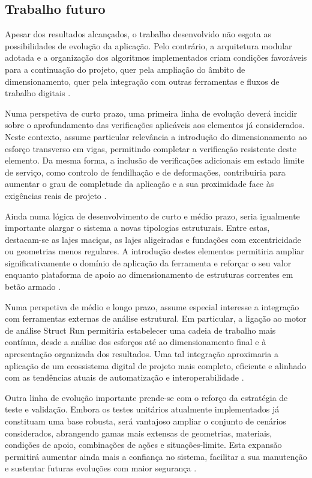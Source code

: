 \subsection{Trabalho futuro}

Apesar dos resultados alcançados, o trabalho desenvolvido não esgota as possibilidades de evolução da aplicação. Pelo contrário, a arquitetura modular adotada e a organização dos algoritmos implementados criam condições favoráveis para a continuação do projeto, quer pela ampliação do âmbito de dimensionamento, quer pela integração com outras ferramentas e fluxos de trabalho digitais \cite{DjangoDocs,PythonDocs,Structrun}.

Numa perspetiva de curto prazo, uma primeira linha de evolução deverá incidir sobre o aprofundamento das verificações aplicáveis aos elementos já considerados. Neste contexto, assume particular relevância a introdução do dimensionamento ao esforço transverso em vigas, permitindo completar a verificação resistente deste elemento. Da mesma forma, a inclusão de verificações adicionais em estado limite de serviço, como controlo de fendilhação e de deformações, contribuiria para aumentar o grau de completude da aplicação e a sua proximidade face às exigências reais de projeto \cite{EN1992,Appleton,AppletonGomes}.

Ainda numa lógica de desenvolvimento de curto e médio prazo, seria igualmente importante alargar o sistema a novas tipologias estruturais. Entre estas, destacam-se as lajes maciças, as lajes aligeiradas e fundações com excentricidade ou geometrias menos regulares. A introdução destes elementos permitiria ampliar significativamente o domínio de aplicação da ferramenta e reforçar o seu valor enquanto plataforma de apoio ao dimensionamento de estruturas correntes em betão armado \cite{EN1992,Mosley,LNECGuias}.

Numa perspetiva de médio e longo prazo, assume especial interesse a integração com ferramentas externas de análise estrutural. Em particular, a ligação ao motor de análise Struct Run permitiria estabelecer uma cadeia de trabalho mais contínua, desde a análise dos esforços até ao dimensionamento final e à apresentação organizada dos resultados. Uma tal integração aproximaria a aplicação de um ecossistema digital de projeto mais completo, eficiente e alinhado com as tendências atuais de automatização e interoperabilidade \cite{Structrun,DjangoDocs}.

Outra linha de evolução importante prende-se com o reforço da estratégia de teste e validação. Embora os testes unitários atualmente implementados já constituam uma base robusta, será vantajoso ampliar o conjunto de cenários considerados, abrangendo gamas mais extensas de geometrias, materiais, condições de apoio, combinações de ações e situações-limite. Esta expansão permitirá aumentar ainda mais a confiança no sistema, facilitar a sua manutenção e sustentar futuras evoluções com maior segurança \cite{DjangoDocs,Goodchild,Mosley}.

